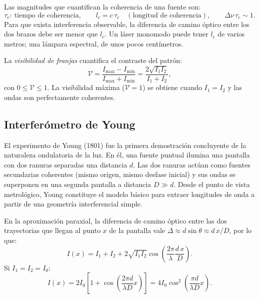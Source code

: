 \documentclass[12pt, a4paper]{article}
\theoremstyle{plain}
\theoremstyle{definition}
\theoremstyle{remark}
\begin{document}
Las magnitudes que cuantifican la coherencia de una fuente son:
\begin{equation}
  \tau_c:\ \text{tiempo de coherencia},\qquad
  l_c=c\,\tau_c\quad (\text{longitud de coherencia}),\qquad
  \Delta\nu\,\tau_c\sim 1.
  \label{eq:coherencia_t6}
\end{equation}
Para que exista interferencia observable, la diferencia de camino óptico entre
los dos brazos debe ser menor que $l_c$. Un láser monomodo puede tener $l_c$
de varios metros; una lámpara espectral, de unos pocos centímetros.

La \emph{visibilidad de franjas} cuantifica el contraste del patrón:
\begin{equation}
  \mathcal{V}=\frac{I_{\max}-I_{\min}}{I_{\max}+I_{\min}}
  =\frac{2\sqrt{I_1I_2}}{I_1+I_2},
  \label{eq:visibilidad_t6}
\end{equation}
con $0 \leq \mathcal{V} \leq 1$. La visibilidad máxima ($\mathcal{V}=1$) se
obtiene cuando $I_1 = I_2$ y las ondas son perfectamente coherentes.

\subsection{Interferómetro de Young}

El experimento de Young (1801) fue la primera demostración concluyente de la
naturaleza ondulatoria de la luz. En él, una fuente puntual ilumina una
pantalla con dos ranuras separadas una distancia $d$. Las dos ranuras actúan
como fuentes secundarias coherentes (mismo origen, mismo desfase inicial) y
sus ondas se superponen en una segunda pantalla a distancia $D \gg d$.
Desde el punto de vista metrológico, Young constituye el modelo básico para
extraer longitudes de onda a partir de una geometría interferencial simple.

En la aproximación paraxial, la diferencia de camino óptico entre las dos
trayectorias que llegan al punto $x$ de la pantalla vale
$\Delta \approx d\sin\theta \approx d\,x/D$, por lo que:
\begin{equation}
  I(x)=I_1+I_2+2\sqrt{I_1I_2}
  \cos\!\left(\frac{2\pi}{\lambda}\frac{d\,x}{D}\right).
  \label{eq:young_intensidad_t6}
\end{equation}
Si $I_1=I_2=I_0$:
\begin{equation}
  I(x)=2I_0\!\left[1+\cos\!\left(\frac{2\pi d}{\lambda D}x\right)\right]
  =4I_0\cos^2\!\left(\frac{\pi d}{\lambda D}x\right).
  \label{eq:young_simetrico_t6}
\end{equation}
\end{document}
